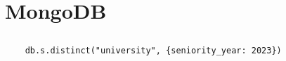 \section{MongoDB}

\subsection{}
\begin{verbatim}
	db.s.distinct("university", {seniority_year: 2023})
\end{verbatim}

\subsection{}

\subsection{}

